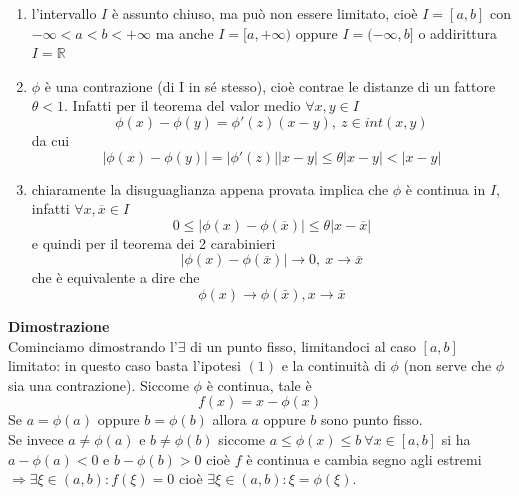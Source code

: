\documentclass[12pt]{article}
\begin{document}
\begin{enumerate}
    \item l'intervallo $I$ è assunto chiuso, ma può non essere limitato, cioè $I=[a,b]$ con $-\infty < a < b < +\infty$ ma anche $I=[a, +\infty)$ oppure $I = (-\infty,b]$ o addirittura $I=\mathbb{R}$
    \item $\phi$ è una contrazione (di I in sé stesso), cioè contrae le distanze di un fattore $\theta < 1$. Infatti per il teorema del valor medio $\forall x,y \in I$
    \begin{equation*}
        \phi(x)-\phi(y)=\phi'(z)(x-y), \ z \in int(x,y)
    \end{equation*}
    da cui
    \begin{equation*}
        |\phi(x)-\phi(y)|=|\phi'(z)||x-y|\leq\theta|x-y|<|x-y|
    \end{equation*}
    
    \item chiaramente la disuguaglianza appena provata implica che $\phi$ è continua in $I$, infatti $\forall x,\overline{x}\in I$
    \begin{equation*}
        0 \leq |\phi(x)-\phi(\overline{x})| \leq \theta |x-\overline{x}|
    \end{equation*}
    e quindi per il teorema dei 2 carabinieri
    \begin{equation*}
            |\phi(x)-\phi(\overline{x})| \rightarrow 0, \ x \rightarrow \overline{x}
    \end{equation*}
    che è equivalente a dire che
        \begin{equation*}
            \phi(x) \rightarrow \phi(\bar{x}), x \rightarrow \bar{x}
        \end{equation*}
\end{enumerate}
\textbf{Dimostrazione}\\
Cominciamo dimostrando l'$\exists$ di un punto fisso, limitandoci al caso $[a,b]$ limitato: in questo caso basta l'ipotesi $(1)$ e la continuità di $\phi$ (non serve che $\phi$ sia una contrazione). Siccome $\phi$ è continua, tale è 
    \begin{equation*}
        f(x) = x - \phi(x)
    \end{equation*}
Se $a = \phi(a)$ oppure $b = \phi(b)$ allora $a$ oppure $b$ sono punto fisso.\\
Se invece $a \neq \phi(a)$ e $b \neq \phi(b)$ siccome $a \leq \phi(x) \leq b \ \forall x \in [a,b]$ si ha $a - \phi(a) < 0$ e $b - \phi(b) > 0$ cioè $f$ è continua e cambia segno agli estremi $\Rightarrow \exists \xi \in (a,b):f(\xi)=0$ cioè $\exists \xi \in (a,b) : \xi = \phi(\xi)$. \\
\end{document}

